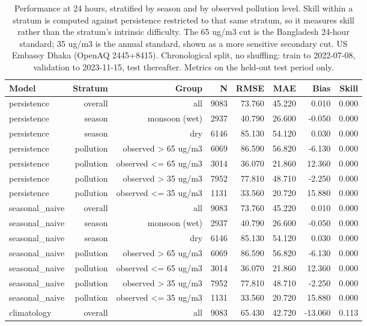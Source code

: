 \begin{table}[htbp]
\caption{Performance at 24 hours, stratified by season and by observed pollution level. Skill within a stratum is computed against persistence restricted to that same stratum, so it measures skill rather than the stratum's intrinsic difficulty. The 65 ug/m3 cut is the Bangladesh 24-hour standard; 35 ug/m3 is the annual standard, shown as a more sensitive secondary cut. US Embassy Dhaka (OpenAQ 2445+8415). Chronological split, no shuffling: train to 2022-07-08, validation to 2023-11-15, test thereafter. Metrics on the held-out test period only.}
\label{tab:stratified_metrics}
\begin{tabular}{lrrrrrrr}
\toprule
Model & Stratum & Group & N & RMSE & MAE & Bias & Skill \\
\midrule
persistence & overall & all & 9083 & 73.760 & 45.220 & 0.010 & 0.000 \\
persistence & season & monsoon (wet) & 2937 & 40.790 & 26.600 & -0.050 & 0.000 \\
persistence & season & dry & 6146 & 85.130 & 54.120 & 0.030 & 0.000 \\
persistence & pollution & observed > 65 ug/m3 & 6069 & 86.590 & 56.820 & -6.130 & 0.000 \\
persistence & pollution & observed <= 65 ug/m3 & 3014 & 36.070 & 21.860 & 12.360 & 0.000 \\
persistence & pollution & observed > 35 ug/m3 & 7952 & 77.810 & 48.710 & -2.250 & 0.000 \\
persistence & pollution & observed <= 35 ug/m3 & 1131 & 33.560 & 20.720 & 15.880 & 0.000 \\
seasonal\_naive & overall & all & 9083 & 73.760 & 45.220 & 0.010 & 0.000 \\
seasonal\_naive & season & monsoon (wet) & 2937 & 40.790 & 26.600 & -0.050 & 0.000 \\
seasonal\_naive & season & dry & 6146 & 85.130 & 54.120 & 0.030 & 0.000 \\
seasonal\_naive & pollution & observed > 65 ug/m3 & 6069 & 86.590 & 56.820 & -6.130 & 0.000 \\
seasonal\_naive & pollution & observed <= 65 ug/m3 & 3014 & 36.070 & 21.860 & 12.360 & 0.000 \\
seasonal\_naive & pollution & observed > 35 ug/m3 & 7952 & 77.810 & 48.710 & -2.250 & 0.000 \\
seasonal\_naive & pollution & observed <= 35 ug/m3 & 1131 & 33.560 & 20.720 & 15.880 & 0.000 \\
climatology & overall & all & 9083 & 65.430 & 42.720 & -13.060 & 0.113 \\

\end{tabular}
\end{table}
